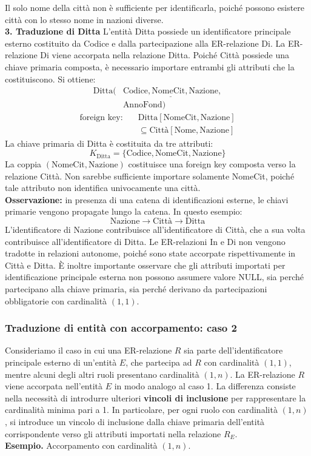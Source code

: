 \noindent
Il solo nome della città non è sufficiente
per identificarla, poiché possono esistere
città con lo stesso nome in nazioni diverse.\medskip\\
\noindent
\textbf{3. Traduzione di Ditta}
L'entità Ditta possiede un identificatore
principale esterno costituito da Codice
e dalla partecipazione alla ER-relazione Di.
La ER-relazione Di viene accorpata nella
relazione Ditta.
Poiché Città possiede una chiave primaria
composta, è necessario importare entrambi
gli attributi che la costituiscono.
Si ottiene:
\[
\begin{aligned}
\text{Ditta}(&
\underline{\text{Codice},\text{NomeCit},
\text{Nazione}},\\
&\text{AnnoFond})
\end{aligned}
\]
\[
\begin{aligned}
\text{foreign key:}\quad
&\text{Ditta}[\text{NomeCit},\text{Nazione}]\\
&\subseteq
\text{Città}[\text{Nome},\text{Nazione}]
\end{aligned}
\]
\noindent
La chiave primaria di Ditta è costituita
da tre attributi:
\[
K_{\text{Ditta}}=
\{\text{Codice},\text{NomeCit},\text{Nazione}\}
\]
\noindent
La coppia $(\text{NomeCit},\text{Nazione})$
costituisce una foreign key composta verso
la relazione Città.
Non sarebbe sufficiente importare solamente
NomeCit, poiché tale attributo non identifica
univocamente una città.\medskip\\
\noindent
\textbf{Osservazione:} in presenza di una
catena di identificazioni esterne, le chiavi
primarie vengono propagate lungo la catena.
In questo esempio:
\[
\text{Nazione}
\longrightarrow
\text{Città}
\longrightarrow
\text{Ditta}
\]
\noindent
L'identificatore di Nazione contribuisce
all'identificatore di Città, che a sua volta
contribuisce all'identificatore di Ditta.
Le ER-relazioni In e Di non vengono tradotte
in relazioni autonome, poiché sono state
accorpate rispettivamente in Città e Ditta.
È inoltre importante osservare che gli
attributi importati per identificazione
principale esterna non possono assumere
valore NULL, sia perché partecipano alla
chiave primaria, sia perché derivano da
partecipazioni obbligatorie con cardinalità
$(1,1)$.

\subsubsection{Traduzione di entità con accorpamento:
caso 2}

Consideriamo il caso in cui una ER-relazione $R$
sia parte dell'identificatore principale esterno
di un'entità $E$, che partecipa ad $R$ con
cardinalità $(1,1)$, mentre alcuni degli altri
ruoli presentano cardinalità $(1,n)$.
La ER-relazione $R$ viene accorpata nell'entità
$E$ in modo analogo al caso 1.
La differenza consiste nella necessità di
introdurre ulteriori \textbf{vincoli di inclusione}
per rappresentare la cardinalità minima pari a 1.
In particolare, per ogni ruolo con cardinalità
$(1,n)$, si introduce un vincolo di inclusione
dalla chiave primaria dell'entità corrispondente
verso gli attributi importati nella relazione $R_E$.\medskip\\
\noindent
\textcolor{verdeEsempio}{\textbf{Esempio. }}
Accorpamento con cardinalità $(1,n)$.

